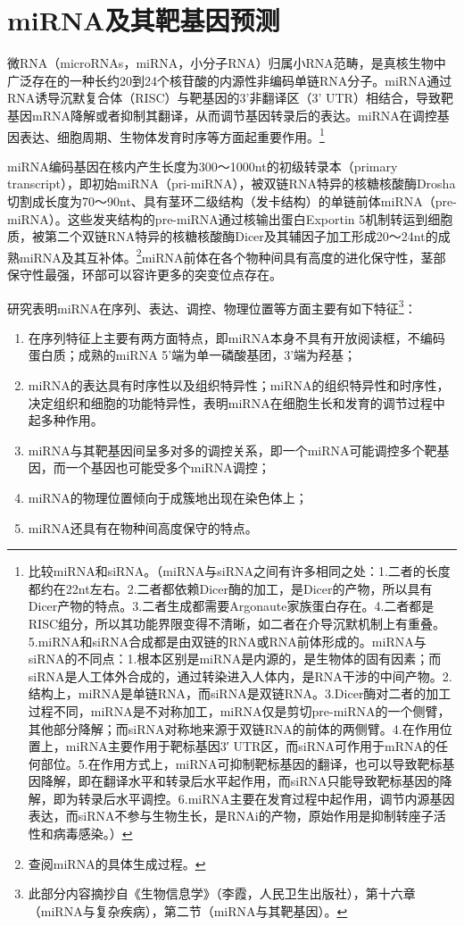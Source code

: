 \documentclass[11pt,a4paper,twoside]{book}
\begin{document}
\section{miRNA及其靶基因预测}
微RNA（microRNAs，miRNA，小分子RNA）归属小RNA范畴，是真核生物中广泛存在的一种长约20到24个核苷酸的内源性非编码单链RNA分子。miRNA通过RNA诱导沉默复合体（RISC）与靶基因的3'非翻译区（3' UTR）相结合，导致靶基因mRNA降解或者抑制其翻译，从而调节基因转录后的表达。miRNA在调控基因表达、细胞周期、生物体发育时序等方面起重要作用。\footnote{比较miRNA和siRNA。（miRNA与siRNA之间有许多相同之处：1.二者的长度都约在22nt左右。2.二者都依赖Dicer酶的加工，是Dicer的产物，所以具有Dicer产物的特点。3.二者生成都需要Argonaute家族蛋白存在。4.二者都是RISC组分，所以其功能界限变得不清晰，如二者在介导沉默机制上有重叠。5.miRNA和siRNA合成都是由双链的RNA或RNA前体形成的。miRNA与siRNA的不同点：1.根本区别是miRNA是内源的，是生物体的固有因素；而siRNA是人工体外合成的，通过转染进入人体内，是RNA干涉的中间产物。2.结构上，miRNA是单链RNA，而siRNA是双链RNA。3.Dicer酶对二者的加工过程不同，miRNA是不对称加工，miRNA仅是剪切pre-miRNA的一个侧臂，其他部分降解；而siRNA对称地来源于双链RNA的前体的两侧臂。4.在作用位置上，miRNA主要作用于靶标基因3′ UTR区，而siRNA可作用于mRNA的任何部位。5.在作用方式上，miRNA可抑制靶标基因的翻译，也可以导致靶标基因降解，即在翻译水平和转录后水平起作用，而siRNA只能导致靶标基因的降解，即为转录后水平调控。6.miRNA主要在发育过程中起作用，调节内源基因表达，而siRNA不参与生物生长，是RNAi的产物，原始作用是抑制转座子活性和病毒感染。）}

miRNA编码基因在核内产生长度为300～1000nt的初级转录本（primary transcript），即初始miRNA（pri-miRNA），被双链RNA特异的核糖核酸酶Drosha切割成长度为70～90nt、具有茎环二级结构（发卡结构）的单链前体miRNA（pre-miRNA）。这些发夹结构的pre-miRNA通过核输出蛋白Exportin 5机制转运到细胞质，被第二个双链RNA特异的核糖核酸酶Dicer及其辅因子加工形成20～24nt的成熟miRNA及其互补体。\footnote{查阅miRNA的具体生成过程。}miRNA前体在各个物种间具有高度的进化保守性，茎部保守性最强，环部可以容许更多的突变位点存在。

研究表明miRNA在序列、表达、调控、物理位置等方面主要有如下特征\footnote{此部分内容摘抄自《生物信息学》（李霞，人民卫生出版社），第十六章（miRNA与复杂疾病），第二节（miRNA与其靶基因）。}：
\begin{enumerate}
  \item 在序列特征上主要有两方面特点，即miRNA本身不具有开放阅读框，不编码蛋白质；成熟的miRNA 5'端为单一磷酸基团，3'端为羟基；
  \item miRNA的表达具有时序性以及组织特异性；miRNA的组织特异性和时序性，决定组织和细胞的功能特异性，表明miRNA在细胞生长和发育的调节过程中起多种作用。
  \item miRNA与其靶基因间呈多对多的调控关系，即一个miRNA可能调控多个靶基因，而一个基因也可能受多个miRNA调控；
  \item miRNA的物理位置倾向于成簇地出现在染色体上；
  \item miRNA还具有在物种间高度保守的特点。
\end{enumerate}
\end{document}
